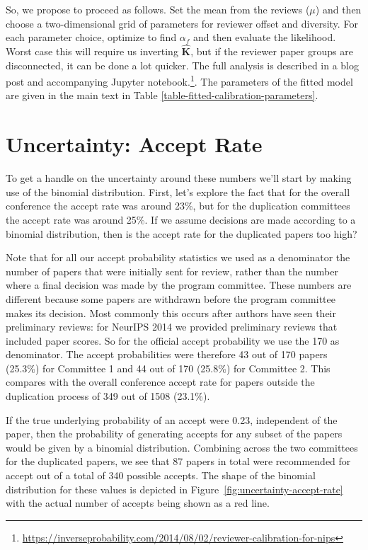 So, we propose to proceed as follows. Set the mean from the reviews
(\(\mu\)) and then choose a two-dimensional grid of parameters for
reviewer offset and diversity. For each parameter choice, optimize to
find \(\alpha_f\) and then evaluate the likelihood. Worst case this will
require us inverting \(\hat{\mathbf{K}}\), but if the reviewer paper
groups are disconnected, it can be done a lot quicker.  The full
analysis is described in a blog post and accompanying Jupyter notebook.\footnote{\url{https://inverseprobability.com/2014/08/02/reviewer-calibration-for-nips}}.  The parameters of the fitted model are given in the main text in
Table \ref{table-fitted-calibration-parameters}.


\section{Uncertainty: Accept Rate}\label{uncertainty-accept-rate}

To get a handle on the uncertainty around these numbers we'll start by
making use of the
binomial distribution.
First, let's explore the fact that for the overall conference the accept
rate was around 23\%, but for the duplication committees the accept rate
was around 25\%. If we assume decisions are made according to a binomial
distribution, then is the accept rate for the duplicated papers too
high?

Note that for all our accept probability statistics we used as a
denominator the number of papers that were initially sent for review,
rather than the number where a final decision was made by the program
committee. These numbers are different because some papers are withdrawn
before the program committee makes its decision. Most commonly this
occurs after authors have seen their preliminary reviews: for NeurIPS 2014
we provided preliminary reviews that included paper scores. So for the
official accept probability we use the 170 as denominator. The accept
probabilities were therefore 43 out of 170 papers (25.3\%) for Committee
1 and 44 out of 170 (25.8\%) for Committee 2. This compares with the
overall conference accept rate for papers outside the duplication
process of 349 out of 1508 (23.1\%).

If the true underlying probability of an accept were 0.23, independent
of the paper, then the probability of generating accepts for any subset
of the papers would be given by a binomial distribution. Combining
across the two committees for the duplicated papers, we see that 87
papers in total were recommended for accept out of a total of 340
possible accepts. The shape of the binomial distribution for these values is 
depicted in Figure~\ref{fig:uncertainty-accept-rate} with the actual number of accepts being shown as a red line.


